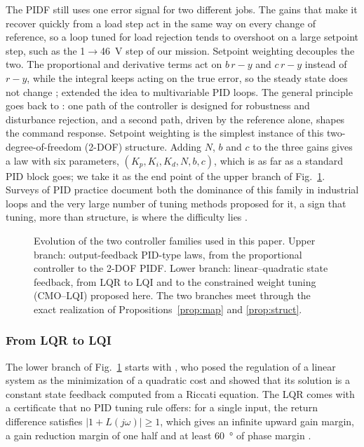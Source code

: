 The PIDF still uses one error signal for two different jobs. The gains that
make it recover quickly from a load step act in the same way on every change
of reference, so a loop tuned for load rejection tends to overshoot on a large
setpoint step, such as the \SI{1}{}$\to$\SI{46}{V} step of our mission.
Setpoint weighting decouples the two. The proportional and derivative terms act
on $b\,r-y$ and $c\,r-y$ instead of $r-y$, while the integral keeps acting on the
true error, so the steady state does not change \citep{Astrom2006,Astrom2001};
\citet{Bianchi2008} extended the idea to multivariable PID loops. The general
principle goes back to \citet{Horowitz1963}: one path of the controller is
designed for robustness and disturbance rejection, and a second path, driven by
the reference alone, shapes the command response. Setpoint weighting is the
simplest instance of this two-degree-of-freedom (2-DOF) structure. Adding $N$,
$b$ and $c$ to the three gains gives a law with six parameters,
$(K_p,K_i,K_d,N,b,c)$, which is as far as a standard PID block goes; we take it
as the end point of the upper branch of Fig.~\ref{fig:evolution}. Surveys of
PID practice document both the dominance of this family in industrial loops and
the very large number of tuning methods proposed for it, a sign that tuning,
more than structure, is where the difficulty lies \citep{Astrom2001,Ang2005}.

\begin{figure}[t]
\centering
\resizebox{\textwidth}{!}{}
\caption{Evolution of the two controller families used in this paper. Upper
branch: output-feedback PID-type laws, from the proportional controller to the
2-DOF PIDF. Lower branch: linear--quadratic state feedback, from LQR to LQI and
to the constrained weight tuning (CMO--LQI) proposed here. The two branches meet
through the exact realization of Propositions~\ref{prop:map} and
\ref{prop:struct}.}
\label{fig:evolution}
\end{figure}

\subsubsection{From LQR to LQI}
The lower branch of Fig.~\ref{fig:evolution} starts with \citet{Kalman1960},
who posed the regulation of a linear system as the minimization of a quadratic
cost and showed that its solution is a constant state feedback computed from a
Riccati equation. The LQR comes with a certificate that no PID tuning rule
offers: for a single input, the return difference satisfies $|1+L(j\omega)|\ge1$,
which gives an infinite upward gain margin, a gain reduction margin of one half
and at least \SI{60}{\degree} of phase margin \citep{Kalman1964,Safonov1977,Anderson1990}.

